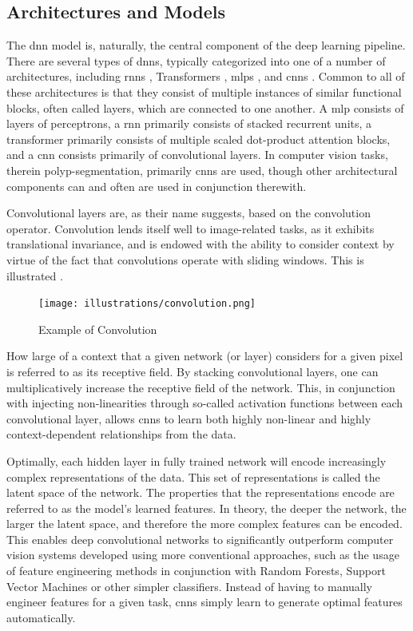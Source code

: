     \subsection{Architectures and Models}
        The \gls{dnn} model is, naturally, the central component of the deep learning pipeline. There are several types of \glspl{dnn}, typically categorized into one of a number of architectures, including \glspl{rnn} \cite{rnns}, Transformers \cite{transformer}, \glspl{mlp} \cite{neural_nets}, and \glspl{cnn} \cite{cnn_survey}. Common to all of these architectures is that they consist of multiple instances of similar functional blocks, often called layers, which are connected to one another. A \gls{mlp} consists of layers of perceptrons, a \gls{rnn} primarily consists of stacked recurrent units, a transformer primarily consists of multiple scaled dot-product attention blocks, and a \gls{cnn} consists primarily of convolutional layers. In computer vision tasks, therein polyp-segmentation, primarily  \glspl{cnn} are used, though other architectural components can and often are used in conjunction therewith.
        
        Convolutional layers are, as their name suggests, based on the convolution operator. Convolution lends itself well to image-related tasks, as it exhibits translational invariance, and is endowed with the ability to consider context by virtue of the fact that convolutions operate with sliding windows. This is illustrated . 
        \begin{figure}
            \centering
            \texttt{[image: illustrations/convolution.png]}
            \caption{Example of Convolution}
            \label{fig:convolution}
        \end{figure}
        
        How large of a context that a given network (or layer) considers for a given pixel is referred to as its receptive field. By stacking convolutional layers, one can multiplicatively increase the receptive field of the network. This, in conjunction with injecting non-linearities through so-called activation functions between each convolutional layer, allows \glspl{cnn} to learn  both highly non-linear and highly context-dependent relationships from the data. 
        
        Optimally, each hidden layer in fully trained network will encode increasingly complex representations of the data. This set of representations is called the latent space of the network. The properties that the representations encode are referred to as the model's learned features. In theory, the deeper the network, the larger the latent space, and therefore the more complex features can be encoded. This enables deep convolutional networks to significantly outperform computer vision systems developed using more conventional approaches, such as the usage of feature engineering methods in conjunction with Random Forests, Support Vector Machines or other simpler classifiers. Instead of having to manually engineer features for a given task, \glspl{cnn} simply learn to generate optimal features automatically.
        
